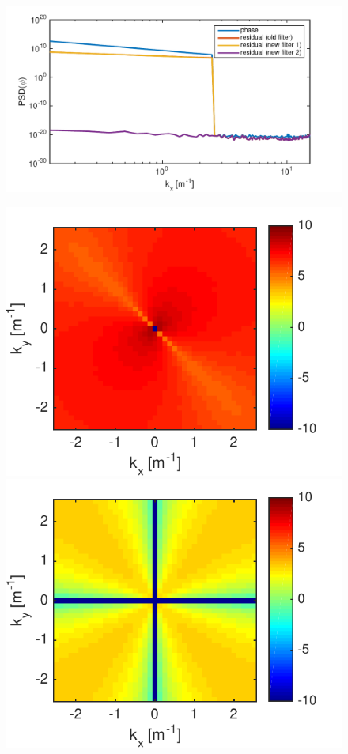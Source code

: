 \documentclass[pdf]{note}
\begin{document}
\begin{figure}[htdp]
    \centerline{
      \includegraphics[scale=0.8]{plots/psdPhaseLO_Odd}
    }
    \centerline{
      \includegraphics[scale=0.8]{plots/psdPhaseLO_Odd_2D_old}
      \includegraphics[scale=0.8]{plots/psdPhaseLO_Odd_2D_new2} 
}
\end{figure}
\end{document}
